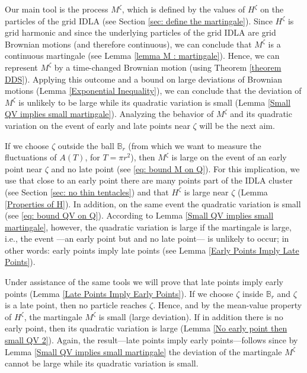 \documentclass[11pt]{article}
\numberwithin{equation}{section}
\begin{document}
Our main tool is the process $M^{\zeta}$, which is defined by the values of 
$H^{\zeta}$ on the particles of the grid IDLA 
(see Section \ref{sec: define the martingale}). 
Since $H^{\zeta}$ is grid harmonic and since the underlying particles 
of the grid IDLA are grid Brownian motions (and therefore continuous), 
we can conclude that $M^{\zeta}$ is a continuous martingale (see Lemma \ref{lemma M : martingale}). 
Hence, we can represent $M^{\zeta}$ by a time-changed Brownian 
motion (using Theorem \ref{theorem DDS}). 
Applying this outcome and a bound on large deviations of 
Brownian motions (Lemma \ref{Exponential Inequality}), we can conclude that 
the deviation of $M^{\zeta}$ is unlikely to be large while
its quadratic variation is small (Lemma \ref{Small QV implies small martingale}).
Analyzing the behavior of $M^{\zeta}$ and its 
quadratic variation on the event of early and late points 
near $\zeta$ will be the next aim. 

If we choose $\zeta$ outside the ball $\mathbb{B}_r$ 
(from which we want to measure the fluctuations of \hbox{$A(T)$}, for $T = \pi r^2$),
then $M^{\zeta}$ is large on the event of an early point near $\zeta$ and no late point 
(see \eqref{eq: bound M on Q}).
For this implication, we use that close to an early point there are many points part of the IDLA cluster 
(see Section \ref{sec: no thin tentacles}) and that $H^{\zeta}$ is large near $\zeta$ (Lemma \ref{Properties of H}).
In addition, on the same event the quadratic variation is small (see \eqref{eq: bound QV on Q}). 
According to Lemma \ref{Small QV implies small martingale}, however, 
the quadratic variation is large if the martingale is large, i.e., 
the event —an early point but and no late point— is unlikely to occur; 
in other words: early points imply late points (see Lemma \ref{Early Points Imply Late Points}). 

Under assistance of the same tools we will prove that late points imply early points 
(Lemma \ref{Late Points Imply Early Points}). 
If we choose $\zeta$ inside $\mathbb{B}_r$ and $\zeta$ is a late point, 
then no particle reaches $\zeta$. 
Hence, and by the mean-value property of $H^{\zeta}$,  
the martingale $M^{\zeta}$ is small (large deviation). 
If in addition there is no early point, then  
its quadratic variation is large (Lemma \ref{No early point then small QV 2}). 
Again, the result—late points imply early points—follows since 
by Lemma \ref{Small QV implies small martingale} the deviation of the martingale $M^{\zeta}$ 
cannot be large while its quadratic variation is small.
\end{document}
